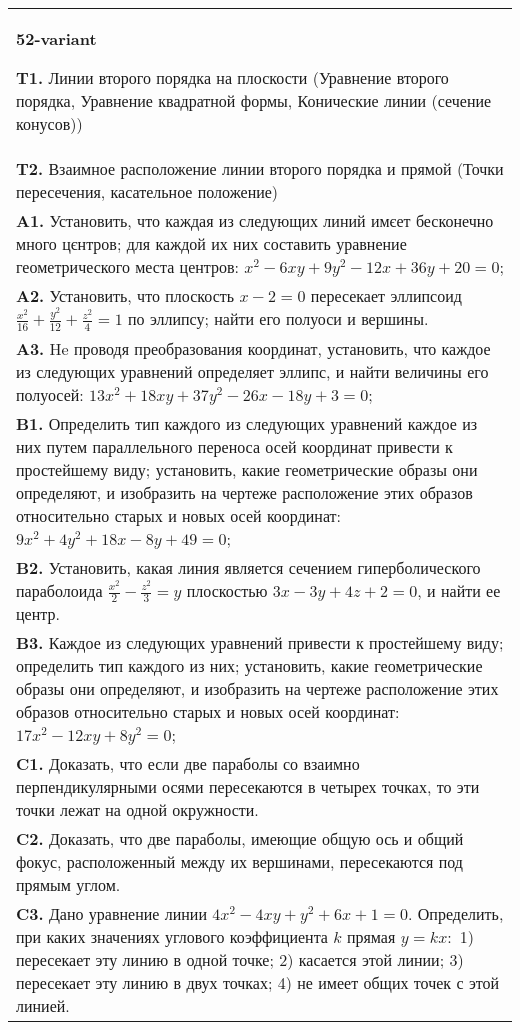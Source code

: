 \documentclass{article}
\begin{document}
\begin{tabular}{m{17cm}}
\textbf{52-variant}
\newline

\textbf{T1.} Линии второго порядка на плоскости (Уравнение второго порядка, Уравнение квадратной формы, Конические линии (сечение конусов)) \\
\textbf{T2.} Взаимное расположение линии второго порядка и прямой (Точки пересечения, касательное положение) \\
\textbf{A1.} Установить, что каждая из следующих линий имєет бесконечно много цєнтров; для каждой их них составить уравнение геометрического места центров: $x^2-6 x y+9 y^2-12 x+36 y+20=0$; \\
\textbf{A2.} Установить, что плоскость $x-2=0$ пересекает эллипсоид $\frac{x^2}{16}+\frac{y^2}{12}+\frac{z^2}{4}=1$ по эллипсу; найти его полуоси и вершины. \\
\textbf{A3.} He проводя преобразования координат, установить, что каждое из следующих уравнений определяет эллипс, и найти величины его полуосей: $13 x^2+18 x y+37 y^2-26 x-18 y+3=0$; \\
\textbf{B1.} Определить тип каждого из следующих уравнений каждое из них путем параллельного переноса осей координат привести к простейшему виду; установить, какие геометрические образы они определяют, и изобразить на чертеже расположение этих образов относительно старых и новых осей координат: $9 x^2+4 y^2+18 x-8 y+49=0$; \\
\textbf{B2.} Установить, какая линия является сечением гиперболического параболоида $\frac{x^2}{2}-\frac{z^2}{3}=y$ плоскостью $3 x-3 y+4 z+2=0$, и найти ее центр. \\
\textbf{B3.} Каждое из следующих уравнений привести к простейшему виду; определить тип каждого из них; установить, какие геометрические образы они определяют, и изобразить на чертеже расположение этих образов относительно старых и новых осей координат: $17 x^2-12 x y+8 y^2=0$; \\
\textbf{C1.} Доказать, что если две параболы со взаимно перпендикулярными осями пересекаются в четырех точках, то эти точки лежат на одной окружности. \\
\textbf{C2.} Доказать, что две параболы, имеющие общую ось и общий фокус, расположенный между их вершинами, пересекаются под прямым углом. \\
\textbf{C3.} Дано уравнение линии $4 x^2-4 x y+y^2+6 x+1=0$. Определить, при каких значениях углового коэффициента $k$ прямая $y=k x:$ 1) пересекает эту линию в одной точке; 2) касается этой линии; 3) пересекает эту линию в двух точках; 4) не имеет общих точек с этой линией. \\

\end{tabular}
\vspace{1cm}
\end{document}
